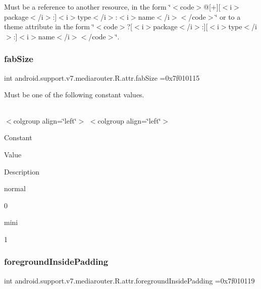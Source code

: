 Must be a reference to another resource, in the form \char`\"{}$<$code$>$@\mbox{[}+\mbox{]}\mbox{[}$<$i$>$package$<$/i$>$\+:\mbox{]}$<$i$>$type$<$/i$>$\+:$<$i$>$name$<$/i$>$$<$/code$>$\char`\"{} or to a theme attribute in the form \char`\"{}$<$code$>$?\mbox{[}$<$i$>$package$<$/i$>$\+:\mbox{]}\mbox{[}$<$i$>$type$<$/i$>$\+:\mbox{]}$<$i$>$name$<$/i$>$$<$/code$>$\char`\"{}. \mbox{\label{classandroid_1_1support_1_1v7_1_1mediarouter_1_1R_1_1attr_a0ede172ed4b9ba8bf23af12e26f093fe}} 
\subsubsection{\texorpdfstring{fab\+Size}{fabSize}}
{\footnotesize\ttfamily int android.\+support.\+v7.\+mediarouter.\+R.\+attr.\+fab\+Size =0x7f010115\hspace{0.3cm}{\ttfamily [static]}}

Must be one of the following constant values.

\tabulinesep=1mm
\begin{longtabu} spread 0pt [c]{*{0}{|X[-1]}|}
\hline
\end{longtabu}
$<$colgroup align=\char`\"{}left\char`\"{}$>$ $<$colgroup align=\char`\"{}left\char`\"{}$>$ 

Constant

Value

Description 

{\ttfamily normal}

0

{\ttfamily mini}

1\mbox{\label{classandroid_1_1support_1_1v7_1_1mediarouter_1_1R_1_1attr_a129677eb00ce5dab4f2c98640e902998}} 
\subsubsection{\texorpdfstring{foreground\+Inside\+Padding}{foregroundInsidePadding}}
{\footnotesize\ttfamily int android.\+support.\+v7.\+mediarouter.\+R.\+attr.\+foreground\+Inside\+Padding =0x7f010119\hspace{0.3cm}{\ttfamily [static]}}

